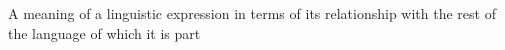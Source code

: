 A meaning of a linguistic expression in terms of its relationship with the rest of the language of which it is part
